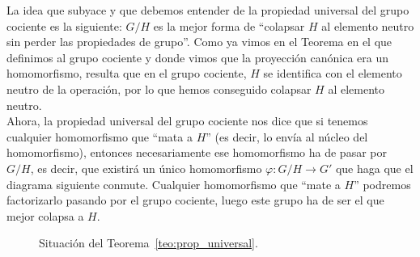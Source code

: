 La idea que subyace y que debemos entender de la propiedad universal del grupo cociente es la siguiente: $G/H$ es la mejor forma de ``colapsar $H$ al elemento neutro sin perder las propiedades de grupo''. Como ya vimos en el Teorema en el que definimos al grupo cociente y donde vimos que la proyección canónica era un homomorfismo, resulta que en el grupo cociente, $H$ se identifica con el elemento neutro de la operación, por lo que hemos conseguido colapsar $H$ al elemento neutro.\\

Ahora, la propiedad universal del grupo cociente nos dice que si tenemos cualquier homomorfismo que ``mata a $H$'' (es decir, lo envía al núcleo del homomorfismo), entonces necesariamente ese homomorfismo ha de pasar por $G/H$, es decir, que existirá un único homomorfismo $\varphi:G/H\to G'$ que haga que el diagrama siguiente conmute. Cualquier homomorfismo que ``mate a $H$'' podremos factorizarlo pasando por el grupo cociente, luego este grupo ha de ser el que mejor colapsa a $H$.

\begin{figure}[H]
    \centering
    \caption{Situación del Teorema~\ref{teo:prop_universal}.}
    \label{fig:teo_propiedad_universal}
\end{figure}

